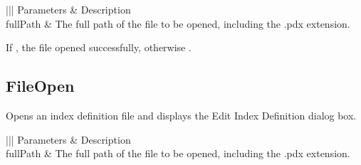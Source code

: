 \documentclass[letterpaper,12pt,english,openany,oneside]{sphinxmanual}
\begin{document}


\begin{savenotes}\sphinxattablestart
\centering
\begin{tabular}[t]{|||}
\hline
\sphinxstyletheadfamily 
Parameters
&\sphinxstyletheadfamily 
Description
\\
\hline
fullPath
&
The full path of the file to be opened, including the .pdx extension.
\\
\hline
\end{tabular}
\par
\sphinxattableend\end{savenotes}


If , the file opened successfully, otherwise .


\subsection{FileOpen}
\label{\detokenize{IAC_API_CatalogCatIntro:fileopen}}
Opens an index definition file and displays the Edit Index Definition dialog box.


\begin{sphinxVerbatim}[commandchars=\\\{\}]
\PYG{p}{[} \PYG{p}{]}
\end{sphinxVerbatim}
\label{\detokenize{IAC_API_CatalogCatIntro:parameters-1}}


\begin{savenotes}\sphinxattablestart
\centering
{}\label{\detokenize{IAC_API_CatalogCatIntro:section-1}}\nobreak
\begin{tabular}[t]{|||}
\hline
\sphinxstyletheadfamily 
Parameters
&\sphinxstyletheadfamily 
Description
\\
\hline
fullPath
&
The full path of the file to be opened, including the .pdx extension.
\\
\hline
\end{tabular}
\par
\sphinxattableend\end{savenotes}

\end{document}
